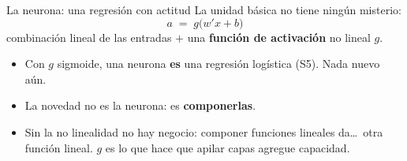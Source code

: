 \documentclass{beamer}
\newcommand{\1}{\mathbb{I}}
\begin{document}
\begin{frame}{La neurona: una regresión con actitud}
\small
La unidad básica no tiene ningún misterio:
\[ a \;=\; g\big( w'x + b \big) \]
combinación lineal de las entradas $+$ una \textbf{función de activación} no lineal $g$.

\vspace{0.15cm}
\begin{center}
\end{center}
\pause

\begin{itemize}\itemsep4pt
  \item Con $g$ sigmoide, una neurona \textbf{es} una regresión logística (S5). Nada nuevo aún.
  \item La novedad no es la neurona: es \textbf{componerlas}. \pause
  \item Sin la no linealidad no hay negocio: componer funciones lineales da\ldots\ otra función lineal. $g$ es lo que hace que apilar capas agregue capacidad.
\end{itemize}
\end{frame}
\end{document}
